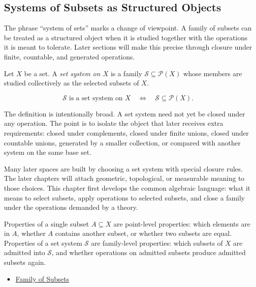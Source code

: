 \subsection{Systems of Subsets as Structured Objects}

\begin{remark*}[Exposition]
The phrase ``system of sets'' marks a change of viewpoint.  A family of
subsets can be treated as a structured object when it is studied together with
the operations it is meant to tolerate.  Later sections will make this precise
through closure under finite, countable, and generated operations.
\end{remark*}

\begin{definition}\label{def:set-system}
Let \(X\) be a set.  A \emph{set system on \(X\)} is a family
\(\mathcal{S}\subseteq\mathcal{P}(X)\) whose members are studied collectively
as the selected subsets of \(X\).
\end{definition}

\begin{remark*}
\[
  \mathcal{S}\text{ is a set system on }X
  \quad\Longleftrightarrow\quad
  \mathcal{S}\subseteq\mathcal{P}(X).
\]
\end{remark*}

\begin{remark*}[Interpretation]
The definition is intentionally broad.  A set system need not yet be closed
under any operation.  The point is to isolate the object that later receives
extra requirements: closed under complements, closed under finite unions,
closed under countable unions, generated by a smaller collection, or compared
with another system on the same base set.
\end{remark*}

\begin{remark*}[Exposition]
Many later spaces are built by choosing a set system with special closure
rules.  The later chapters will attach geometric, topological, or measurable
meaning to those choices.  This chapter first develops the common algebraic
language: what it means to select subsets, apply operations to selected
subsets, and close a family under the operations demanded by a theory.
\end{remark*}

\begin{remark*}[Exposition]
Properties of a single subset \(A\subseteq X\) are point-level properties:
which elements are in \(A\), whether \(A\) contains another subset, or whether
two subsets are equal.  Properties of a set system \(\mathcal{S}\) are
family-level properties: which subsets of \(X\) are admitted into
\(\mathcal{S}\), and whether operations on admitted subsets produce admitted
subsets again.
\end{remark*}

\begin{dependencies}
\begin{itemize}
  \item \hyperref[def:family-of-subsets]{Family of Subsets}
\end{itemize}
\end{dependencies}
